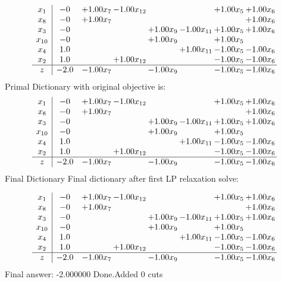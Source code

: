 \documentclass[8pt]{article}
\begin{document}
\[\begin{array}{c| c c@{\hskip 2pt} c@{\hskip 2pt} c@{\hskip 2pt} c@{\hskip 2pt} c@{\hskip 2pt} c@{\hskip 2pt} }
 x_{1}   &  -0 & +  1.00 x_{7} & -1.00 x_{12} &    &   & +  1.00 x_{5} & +  1.00 x_{6}\\
 x_{8}   &  -0 & +  1.00 x_{7} &    &    &    &   & +  1.00 x_{6}\\
 x_{3}   &  -0  &    &   & +  1.00 x_{9} & -1.00 x_{11} & +  1.00 x_{5} & +  1.00 x_{6}\\
 x_{10}   &  -0  &    &   & +  1.00 x_{9} &   & +  1.00 x_{5} &   \\
 x_{4}   &  1.0  &    &    &   & +  1.00 x_{11} & -1.00 x_{5} & -1.00 x_{6}\\
 x_{2}   &  1.0  &   & +  1.00 x_{12} &    &   & -1.00 x_{5} & -1.00 x_{6}\\
\hline
z    &  -2.0 & -1.00 x_{7} &   & -1.00 x_{9} &   & -1.00 x_{5} & -1.00 x_{6}\\
\end{array}\]
Primal Dictionary with original objective is:
\[\begin{array}{c| c c@{\hskip 2pt} c@{\hskip 2pt} c@{\hskip 2pt} c@{\hskip 2pt} c@{\hskip 2pt} c@{\hskip 2pt} }
 x_{1}   &  -0 & +  1.00 x_{7} & -1.00 x_{12} &    &   & +  1.00 x_{5} & +  1.00 x_{6}\\
 x_{8}   &  -0 & +  1.00 x_{7} &    &    &    &   & +  1.00 x_{6}\\
 x_{3}   &  -0  &    &   & +  1.00 x_{9} & -1.00 x_{11} & +  1.00 x_{5} & +  1.00 x_{6}\\
 x_{10}   &  -0  &    &   & +  1.00 x_{9} &   & +  1.00 x_{5} &   \\
 x_{4}   &  1.0  &    &    &   & +  1.00 x_{11} & -1.00 x_{5} & -1.00 x_{6}\\
 x_{2}   &  1.0  &   & +  1.00 x_{12} &    &   & -1.00 x_{5} & -1.00 x_{6}\\
\hline
z    &  -2.0 & -1.00 x_{7} &   & -1.00 x_{9} &   & -1.00 x_{5} & -1.00 x_{6}\\
\end{array}\]
Final Dictionary
Final dictionary after first LP relaxation solve: 

\[\begin{array}{c| c c@{\hskip 2pt} c@{\hskip 2pt} c@{\hskip 2pt} c@{\hskip 2pt} c@{\hskip 2pt} c@{\hskip 2pt} }
 x_{1}   &  -0 & +  1.00 x_{7} & -1.00 x_{12} &    &   & +  1.00 x_{5} & +  1.00 x_{6}\\
 x_{8}   &  -0 & +  1.00 x_{7} &    &    &    &   & +  1.00 x_{6}\\
 x_{3}   &  -0  &    &   & +  1.00 x_{9} & -1.00 x_{11} & +  1.00 x_{5} & +  1.00 x_{6}\\
 x_{10}   &  -0  &    &   & +  1.00 x_{9} &   & +  1.00 x_{5} &   \\
 x_{4}   &  1.0  &    &    &   & +  1.00 x_{11} & -1.00 x_{5} & -1.00 x_{6}\\
 x_{2}   &  1.0  &   & +  1.00 x_{12} &    &   & -1.00 x_{5} & -1.00 x_{6}\\
\hline
z    &  -2.0 & -1.00 x_{7} &   & -1.00 x_{9} &   & -1.00 x_{5} & -1.00 x_{6}\\
\end{array}\]
 Final answer: -2.000000 
Done.Added 0 cuts 
\end{document}
